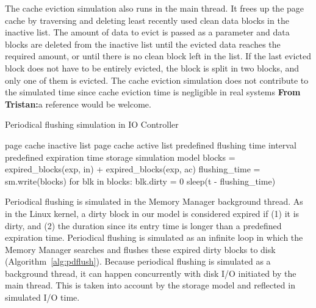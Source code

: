 \documentclass[conference]{IEEEtran}
\newcommand{\Desc}[2]{\State \makebox[2em][l]{#1}#2}
\newcommand{\tristan}[1]{\color{orange}\textbf{From Tristan:}#1\color{black}}
\begin{document}
    The cache eviction simulation also runs in
    the main thread. It frees up the page cache by traversing and deleting 
    least recently used clean data blocks in the inactive list.
    The amount of data to evict is passed as a parameter and data blocks are deleted 
    from the inactive list until the evicted data reaches the required amount,
    or until there is no clean block left in the list.
    If the last evicted block does not have to be entirely evicted, the block is split in two blocks,
    and only one of them is evicted.
    The cache eviction simulation does not contribute to the simulated time 
    since cache eviction time is negligible in real systems \tristan{a reference would be welcome}.
    
    \begin{algorithm}\caption{Periodical flushing simulation in IO Controller}\label{alg:pdflush}
        \small
        \begin{algorithmic}[1]
            \Input
                \Desc{in}{page cache inactive list}
                \Desc{ac}{page cache active list}
                \Desc{t}{predefined flushing time interval}
                \Desc{exp}{predefined expiration time}
                \Desc{sm}{storage simulation model}
               \EndInput
                \State blocks = expired\_blocks(exp, in) + expired\_blocks(exp, ac) 
                \State flushing\_time = sm.write(blocks)
                \State for blk in blocks: blk.dirty = 0
                    \State sleep(t - flushing\_time)
                \EndIf  %
            \EndWhile
        \end{algorithmic}
    \end{algorithm}

    Periodical flushing is simulated in the Memory Manager
    background thread. As in the Linux kernel, a dirty block
    in our model is considered expired if (1) it is dirty, and (2)
    the duration since its entry time is longer than a
    predefined expiration time. 
    Periodical flushing is simulated as an infinite loop in which 
    the Memory Manager searches and flushes these expired dirty blocks to disk (Algorithm~\ref{alg:pdflush}). 
    Because periodical flushing is simulated as a background thread, it can happen concurrently
    with disk I/O initiated by the main thread. This is taken into account by the 
    storage model and reflected in simulated I/O time.
\end{document}
